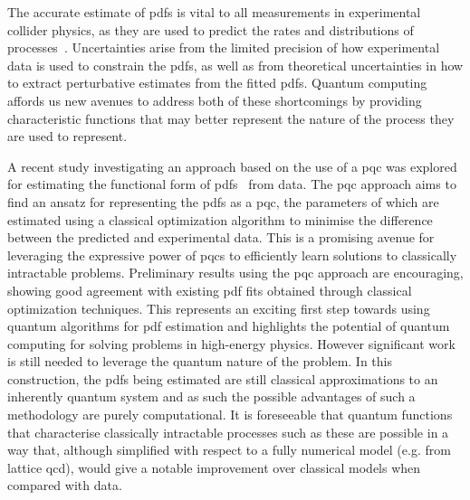 The accurate estimate of \gls{pdfs} is vital to all measurements in experimental collider physics, as they are used to predict the rates and distributions of processes~\cite{practical_collider_physics}. 
Uncertainties arise from the limited precision of how experimental data is used to constrain the \gls{pdfs}, as well as from theoretical uncertainties in how to extract perturbative estimates from the fitted \gls{pdfs}.
Quantum computing affords us new avenues to address both of these shortcomings by providing characteristic functions that may better represent the nature of the process they are used to represent.

A recent study investigating an approach based on the use of a \gls{pqc} was explored for estimating the functional form of \gls{pdfs}~\cite{Perez-Salinas:2020nem} from data. The \gls{pqc} approach aims to find an ansatz for representing the \gls{pdfs} as a \gls{pqc}, the parameters of which are estimated using a classical optimization algorithm to minimise the difference between the predicted and experimental data. This is a promising avenue for leveraging the expressive power of \gls{pqc}s to efficiently learn solutions to classically intractable problems. Preliminary results using the \gls{pqc} approach are encouraging, showing good agreement with existing \gls{pdf} fits obtained through classical optimization techniques. This represents an exciting first step towards using quantum algorithms for \gls{pdf} estimation and highlights the potential of quantum computing for solving problems in high-energy physics. However significant work is still needed to leverage the quantum nature of the problem. In this construction, the \gls{pdfs} being estimated are still classical approximations to an inherently quantum system and as such the possible advantages of such a methodology are purely computational. It is foreseeable that quantum functions that characterise classically intractable processes such as these are possible in a way that, although simplified with respect to a fully numerical model (e.g. from lattice \gls{qcd}), would give a notable improvement over classical models when compared with data.

